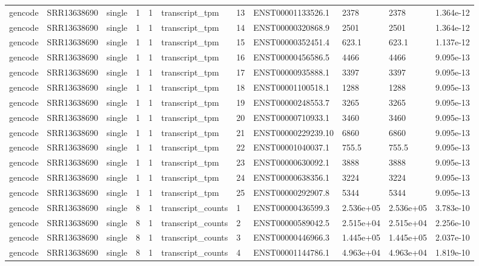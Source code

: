 \begin{tabular}{lllllllllll}
gencode & SRR13638690 & single & 1 & 1 & transcript\_tpm & 13 & ENST00001133526.1 & 2378 & 2378 & 1.364e-12 \\
gencode & SRR13638690 & single & 1 & 1 & transcript\_tpm & 14 & ENST00000320868.9 & 2501 & 2501 & 1.364e-12 \\
gencode & SRR13638690 & single & 1 & 1 & transcript\_tpm & 15 & ENST00000352451.4 & 623.1 & 623.1 & 1.137e-12 \\
gencode & SRR13638690 & single & 1 & 1 & transcript\_tpm & 16 & ENST00000456586.5 & 4466 & 4466 & 9.095e-13 \\
gencode & SRR13638690 & single & 1 & 1 & transcript\_tpm & 17 & ENST00000935888.1 & 3397 & 3397 & 9.095e-13 \\
gencode & SRR13638690 & single & 1 & 1 & transcript\_tpm & 18 & ENST00001100518.1 & 1288 & 1288 & 9.095e-13 \\
gencode & SRR13638690 & single & 1 & 1 & transcript\_tpm & 19 & ENST00000248553.7 & 3265 & 3265 & 9.095e-13 \\
gencode & SRR13638690 & single & 1 & 1 & transcript\_tpm & 20 & ENST00000710933.1 & 3460 & 3460 & 9.095e-13 \\
gencode & SRR13638690 & single & 1 & 1 & transcript\_tpm & 21 & ENST00000229239.10 & 6860 & 6860 & 9.095e-13 \\
gencode & SRR13638690 & single & 1 & 1 & transcript\_tpm & 22 & ENST00001040037.1 & 755.5 & 755.5 & 9.095e-13 \\
gencode & SRR13638690 & single & 1 & 1 & transcript\_tpm & 23 & ENST00000630092.1 & 3888 & 3888 & 9.095e-13 \\
gencode & SRR13638690 & single & 1 & 1 & transcript\_tpm & 24 & ENST00000638356.1 & 3224 & 3224 & 9.095e-13 \\
gencode & SRR13638690 & single & 1 & 1 & transcript\_tpm & 25 & ENST00000292907.8 & 5344 & 5344 & 9.095e-13 \\
gencode & SRR13638690 & single & 8 & 1 & transcript\_counts & 1 & ENST00000436599.3 & 2.536e+05 & 2.536e+05 & 3.783e-10 \\
gencode & SRR13638690 & single & 8 & 1 & transcript\_counts & 2 & ENST00000589042.5 & 2.515e+04 & 2.515e+04 & 2.256e-10 \\
gencode & SRR13638690 & single & 8 & 1 & transcript\_counts & 3 & ENST00000446966.3 & 1.445e+05 & 1.445e+05 & 2.037e-10 \\
gencode & SRR13638690 & single & 8 & 1 & transcript\_counts & 4 & ENST00001144786.1 & 4.963e+04 & 4.963e+04 & 1.819e-10 \\

\end{tabular}
